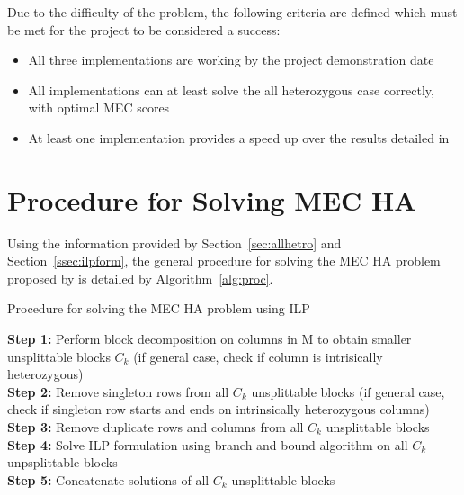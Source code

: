 \documentclass[10pt,twocolumn]{article}
\begin{document}
Due to the difficulty of the problem, the following criteria are defined which must be met for the project to
be considered a success:
\begin{itemize}[noitemsep]
    \item{All three implementations are working by the project demonstration date}
    \item{All implementations can at least solve the all heterozygous case correctly, with optimal MEC scores}
    \item{At least one implementation provides a speed up over the results detailed in \cite{chen:2013} }
\end{itemize}


\section{Procedure for Solving MEC HA} \label{sec:proc}

Using the information provided by Section~\ref{sec:allhetro} and Section~\ref{ssec:ilpform}, the general
procedure for solving the MEC HA problem proposed by \cite{chen:2013} is detailed by Algorithm~\ref{alg:proc}.
\begin{algorithm}[h!]
    \small
    \caption{Procedure for solving the MEC HA problem using ILP}
    \label{alg:proc}
\textbf{Step 1:} Perform block decomposition on columns in M to obtain smaller unsplittable blocks $C_k$ (if 
general case, check if column is intrisically heterozygous)                                                       \\
\textbf{Step 2:} Remove singleton rows from all $C_k$ unsplittable blocks (if general case, check 
if singleton row starts and ends on intrinsically heterozygous columns)                                          \\
\textbf{Step 3:} Remove duplicate rows and columns from all $C_k$ unsplittable blocks 							        \\
\textbf{Step 4:} Solve ILP formulation using branch and bound algorithm on all $C_k$ unpsplittable blocks           \\
\textbf{Step 5:} Concatenate solutions of all $C_k$ unsplittable blocks
\end{algorithm}

\end{document}
